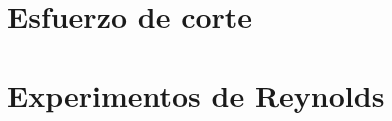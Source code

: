 \documentclass[10pt, oneside]{article}
\newtheorem{defn}{Definition}
\begin{document}
\section{Esfuerzo de corte}

\section{Experimentos de Reynolds}

%
%
\end{document}
